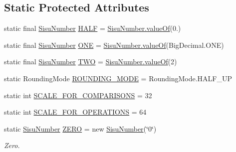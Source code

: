 \subsection*{Static Protected Attributes}
\begin{DoxyCompactItemize}
\item 
static final \hyperlink{classcom_1_1aarrelaakso_1_1drawl_1_1_sisu_number}{Sisu\+Number} \hyperlink{classcom_1_1aarrelaakso_1_1drawl_1_1_sisu_number_afae3e6d652b8c125dccab3e110d038b0}{H\+A\+LF} = \hyperlink{classcom_1_1aarrelaakso_1_1drawl_1_1_sisu_number_a2fa3f605463c6f5cb21a08c93289cab3}{Sisu\+Number.\+value\+Of}(0.)
\item 
static final \hyperlink{classcom_1_1aarrelaakso_1_1drawl_1_1_sisu_number}{Sisu\+Number} \hyperlink{classcom_1_1aarrelaakso_1_1drawl_1_1_sisu_number_ad74e537df980406b3282861605df259c}{O\+NE} = \hyperlink{classcom_1_1aarrelaakso_1_1drawl_1_1_sisu_number_a2fa3f605463c6f5cb21a08c93289cab3}{Sisu\+Number.\+value\+Of}(Big\+Decimal.\+O\+NE)
\item 
static final \hyperlink{classcom_1_1aarrelaakso_1_1drawl_1_1_sisu_number}{Sisu\+Number} \hyperlink{classcom_1_1aarrelaakso_1_1drawl_1_1_sisu_number_a699eb6b7e4648b4a8d888890b32e26f9}{T\+WO} = \hyperlink{classcom_1_1aarrelaakso_1_1drawl_1_1_sisu_number_a2fa3f605463c6f5cb21a08c93289cab3}{Sisu\+Number.\+value\+Of}(2)
\item 
static Rounding\+Mode \hyperlink{classcom_1_1aarrelaakso_1_1drawl_1_1_sisu_number_a98077c422e928740febf571e3f2ec6b5}{R\+O\+U\+N\+D\+I\+N\+G\+\_\+\+M\+O\+DE} = Rounding\+Mode.\+H\+A\+L\+F\+\_\+\+UP
\item 
static int \hyperlink{classcom_1_1aarrelaakso_1_1drawl_1_1_sisu_number_a9355f25a360283c24625dbdf2a397a0c}{S\+C\+A\+L\+E\+\_\+\+F\+O\+R\+\_\+\+C\+O\+M\+P\+A\+R\+I\+S\+O\+NS} = 32
\item 
static int \hyperlink{classcom_1_1aarrelaakso_1_1drawl_1_1_sisu_number_ac514e84eda80c3673b5006716984670a}{S\+C\+A\+L\+E\+\_\+\+F\+O\+R\+\_\+\+O\+P\+E\+R\+A\+T\+I\+O\+NS} = 64
\item 
static \hyperlink{classcom_1_1aarrelaakso_1_1drawl_1_1_sisu_number}{Sisu\+Number} \hyperlink{classcom_1_1aarrelaakso_1_1drawl_1_1_sisu_number_ae9e547c1510ee19d5cc6401c828f1003}{Z\+E\+RO} = new \hyperlink{classcom_1_1aarrelaakso_1_1drawl_1_1_sisu_number}{Sisu\+Number}(\char`\"{}0\char`\"{})
\begin{DoxyCompactList}\small\item\em Zero. \end{DoxyCompactList}\item 

\end{DoxyCompactItemize}
